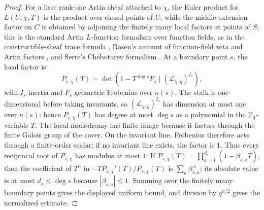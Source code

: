 \begin{proof}
For a lisse rank-one Artin sheaf attached to \(\chi\), the Euler product for \(L(U,\chi,T)\) is the product over closed points of \(U\), while the middle-extension factor on \(C\) is obtained by adjoining the finitely many local factors at points of \(S\); this is the standard Artin \(L\)-function formalism over function fields, as in the constructible-sheaf trace formula \cite{DeligneSGA4half1977,Milne1980Etale}, Rosen's account of function-field zeta and Artin factors \cite{Rosen2002}, and Serre's Chebotarev formalism \cite{Serre1981}. At a boundary point \(s\), the local factor is
\[
P_{s,\chi}(T)=
\det\!\left(1-T^{\deg s}F_s\mid(\mathcal L_{\chi,\bar\eta})^{I_s}\right),
\]
with \(I_s\) inertia and \(F_s\) geometric Frobenius over \(\kappa(s)\).  The
stalk is one-dimensional before taking invariants, so
\((\mathcal L_{\chi,\bar\eta})^{I_s}\) has dimension at most one over
\(\kappa(s)\); hence \(P_{s,\chi}(T)\) has degree at most \(\deg s\) as a
polynomial in the \(\mathbb{F}_q\)-variable \(T\).  The local monodromy has finite
image because it factors through the finite Galois group of the cover.  On the
invariant line, Frobenius therefore acts through a finite-order scalar; if no
invariant line exists, the factor is \(1\).  Thus every reciprocal root of
\(P_{s,\chi}\) has modulus at most \(1\).  If
\(P_{s,\chi}(T)=\prod_{a=1}^{d_s}(1-\beta_{s,a}T)\), then the coefficient of
\(T^n\) in \(-T P_{s,\chi}'(T)/P_{s,\chi}(T)\) is
\(\sum_a \beta_{s,a}^{\,n}\); its absolute value is at most
\(d_s\le \deg s\) because \(|\beta_{s,a}|\le1\). Summing over the finitely many
boundary points gives the displayed uniform bound, and division by \(q^{n/2}\)
gives the normalized estimate.
\end{proof}

